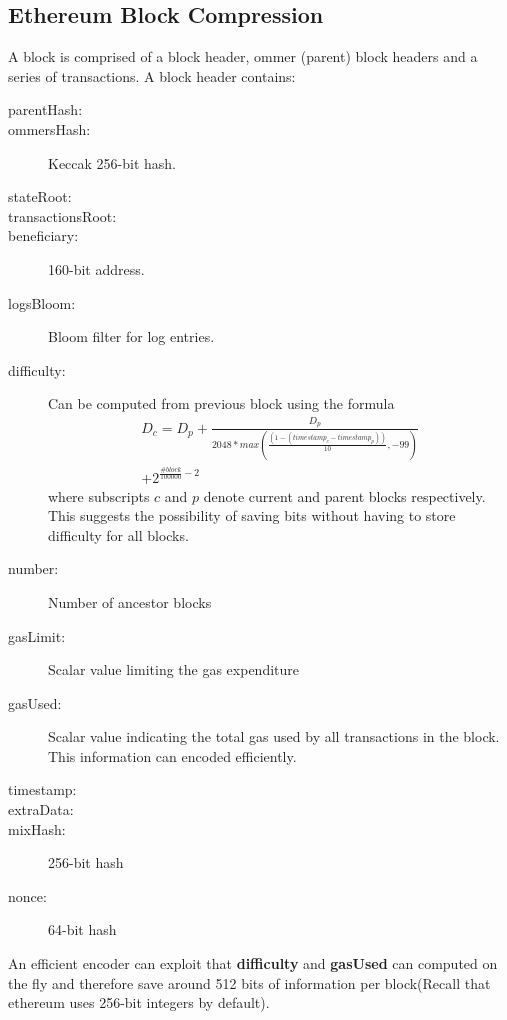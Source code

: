 \subsection{Ethereum Block Compression}\label{sec:blockcompress}

A block is comprised of a block header, ommer (parent) block headers and a series of transactions. 
A block header contains: 

\begin{description}
 \item[parentHash:] 
 \item[ommersHash:]  Keccak 256-bit hash.
 \item[stateRoot:]  
 \item[transactionsRoot:]
 \item[beneficiary:]160-bit address.
 \item[logsBloom:] Bloom filter for log entries.
 \item[difficulty:] Can be computed from previous block using the formula
	\begin{multline*}
	D_{c} = D_{p} + \frac{D_{p}}{2048 * max(\frac{(1 - (timestamp_{c} - timestamp_{p}))}{10}, -99)}\\ + 2^{\frac{\#block}{100000} - 2}
        \end{multline*}
	where subscripts $c$ and $p$ denote current and parent blocks respectively. 
 This suggests the possibility of saving bits without having to store difficulty for all blocks.
 \item[number:] Number of ancestor blocks
 \item[gasLimit:] Scalar value limiting the gas expenditure
 \item[gasUsed:] Scalar value indicating the total gas used by all transactions in the block. This information can encoded efficiently.
 \item[timestamp:]
 \item[extraData:]
 \item[mixHash:] 256-bit hash
 \item[nonce:] 64-bit hash
\end{description}

An efficient encoder can exploit that \textbf{difficulty} and \textbf{gasUsed} can computed on the fly and therefore save around 512 bits of information per block(Recall that ethereum uses 256-bit integers by default).  

